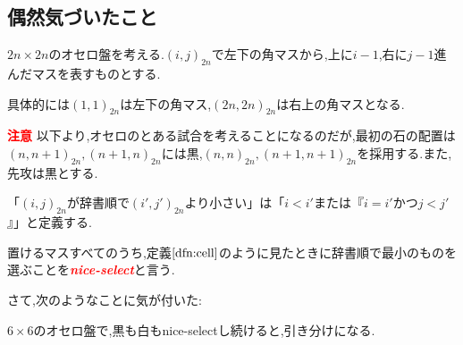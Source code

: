 \documentclass[a4paper,10pt]{ltjsarticle}
\begin{document}
\setcounter{section}{1}

\appendix
\renewcommand{\thesection}{\Alph{section}.\arabic{section}}
\setcounter{section}{0}

\begin{appendices}

\section{偶然気づいたこと}
\begin{tcolorbox}[colback=white,colframe=black]
  \begin{dfn}[]\label{dfn:cell}
    $2n\times2n$のオセロ盤を考える.$(i,j)_{2n}$で左下の角マスから,上に$i-1$,右に$j-1$進んだマスを表すものとする.
  \end{dfn}
\end{tcolorbox}

具体的には$(1,1)_{2n}$は左下の角マス,$(2n,2n)_{2n}$は右上の角マスとなる.

\begin{tcolorbox}[colback=red!4,colframe=red]
  \textcolor{red}{\textbf{注意}} 以下より,オセロのとある試合を考えることになるのだが,最初の石の配置は$(n,n+1)_{2n},(n+1, n)_{2n}$には黒,$(n,n)_{2n},(n+1, n+1)_{2n}$を採用する.また,先攻は黒とする.
\end{tcolorbox}



\begin{tcolorbox}[colback=white,colframe=black]
  \begin{dfn}[]\label{dfn:jisho}
    「$(i,j)_{2n}$が辞書順で$(i',j')_{2n}$より小さい」は「$i<i'$または『$i=i'$かつ$j<j'$』」と定義する.
  \end{dfn}
\end{tcolorbox}

\begin{tcolorbox}[colback=white,colframe=black]
  \begin{dfn}[]\label{dfn:nice_select}
    置けるマスすべてのうち,定義$\ref{dfn:cell}$のように見たときに辞書順で最小のものを選ぶことを\textcolor{red}{\textbf{\textit{\textit{nice-select}}}}と言う.
  \end{dfn}
\end{tcolorbox}


さて,次のようなことに気が付いた:

\begin{tcolorbox}[colback=white,colframe=black]
  \begin{prop}
    $6\times6$のオセロ盤で,黒も白もnice-selectし続けると,引き分けになる.
  \end{prop}
\end{tcolorbox}


\end{appendices}
\end{document}

